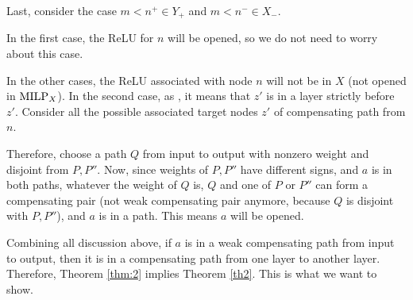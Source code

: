 	Last, consider the case $m<n^+ \in Y_+$ and $m < n^- \in X_-$.
	



In the first case, the ReLU for $n$ will be opened, so we do not need to worry about this case.
			
			In the other cases, the ReLU associated with node $n$ will not be in $X$ 
			(not opened in ${\textrm{MILP}}_X$).
			In the second case, as 
			, it means that $z'$ is in a layer strictly before $z'$.
			Consider all the possible associated target nodes $z'$ of compensating path from $n$.

			
			Therefore, choose a path $Q$ from input to output with nonzero weight and disjoint from $P,P''$. Now, since weights of $P,P''$ have different signs, and $a$ is in both paths, whatever the weight of $Q$ is, $Q$ and one of  $P$ or $P''$ can form a compensating pair (not weak compensating pair anymore, because $Q$ is disjoint with $P,P''$), and $a$ is in a path. This means $a$ will be opened.
			
			Combining all discussion above, if $a$ is in a weak compensating path from input to output, then it is in a compensating path from one layer to another layer. Therefore, Theorem \ref{thm:2} implies Theorem \ref{th2}. This is what we want to show.
			\fi
			

 			
		